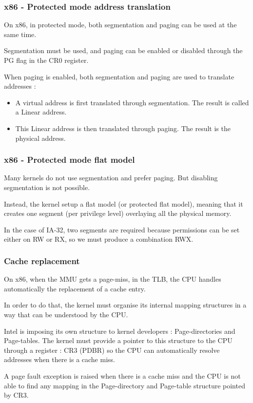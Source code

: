 \begin{frame}
  \frametitle{x86 - Protected mode address translation}

  On x86, in protected mode, both segmentation and paging can be used at the same time.

  \-

  Segmentation must be used, and paging can be enabled or disabled through the PG flag in the CR0 register.

  \-

  When paging is enabled, both segmentation and paging are used to translate addresses :

  \begin{itemize}
  \item A virtual address is first translated through segmentation. The result is called a Linear address.
  \item This Linear address is then translated through paging. The result is the physical address.
  \end{itemize}

\end{frame}


\begin{frame}
  \frametitle{x86 - Protected mode flat model}

  Many kernels do not use segmentation and prefer paging. But
  disabling segmentation is not possible.

  \-

  Instead, the kernel setup a flat model (or protected flat model),
  meaning that it creates one segment (per privilege level) overlaying
  all the physical memory.

  \-

  In the case of IA-32, two segments are required because permissions
  can be set either on RW or RX, so we must produce a combination RWX.

\end{frame}


\begin{frame}
  \frametitle{Cache replacement}

  On x86, when the MMU gets a page-miss, in the TLB, the CPU handles automatically the replacement of a cache entry.

  \-
  
  In order to do that, the kernel must organise its internal mapping structures in a way that can be understood by the CPU.

  \-

  Intel is imposing its own structure to kernel developers : Page-directories and Page-tables. The kernel must provide a pointer to this structure to the CPU through a register : CR3 (PDBR) so the CPU can automatically resolve addresses when there is a cache miss.

  \-

  A page fault exception is raised when there is a cache miss and the CPU is not able to find any mapping in the Page-directory and Page-table structure pointed by CR3.

\end{frame}

